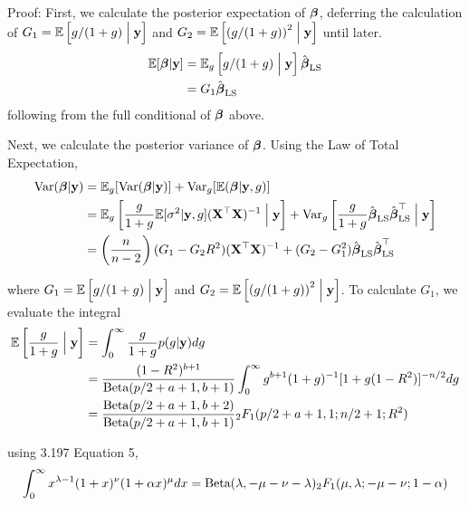 \documentclass{amsart}[12pt]
\begin{document}
Proof:
First, we calculate the posterior expectation of ${\boldsymbol \beta}$, deferring the calculation of
$G_1 = \mathbb{E}\left[g/(1+g) \Bigm| {\bf y} \right]$ and $G_2 = \mathbb{E}\left[ \left(g/(1+g) \right)^2 \Bigm| {\bf y} \right]$
until later.
\begin{align*}
	\mathbb{E}[{\boldsymbol \beta} | {\bf y}] &= \mathbb{E}_g \left[g/(1+g) \Bigm| {\bf y} \right] \hat{{\boldsymbol \beta}}_{\text{LS}} \\
	&= G_1 \hat{{\boldsymbol \beta}}_{\text{LS}}
\end{align*}
following from the full conditional of ${\boldsymbol \beta}$ above.

Next, we calculate the posterior variance of ${\boldsymbol \beta}$. Using the Law of Total Expectation,
\begin{align*}
	\text{Var}({\boldsymbol \beta} | {\bf y}) & = \mathbb{E}_g[\text{Var}({\boldsymbol \beta} | {\bf y})] + \text{Var}_g[\mathbb{E}({\boldsymbol \beta}|{\bf y}, g)]                                                                                                                                                 \\
	                   & = \mathbb{E}_g\left[\frac{g}{1 + g} \mathbb{E}[\sigma^2|{\bf y}, g] ({\bf X}^\top {\bf X})^{-1} \Bigm| {\bf y} \right] + \text{Var}_g\left[\frac{g}{1 + g} \hat{{\boldsymbol \beta}}_{\text{LS}} \hat{{\boldsymbol \beta}}_{\text{LS}}^\top \Bigm| {\bf y} \right]                                   \\
	                   & = \left( \frac{n}{n - 2} \right) (G_1 - G_2 R^2) ({\bf X}^\top {\bf X})^{-1} + (G_2 - G_1^2) \hat{{\boldsymbol \beta}}_{\text{LS}} \hat{{\boldsymbol \beta}}_{\text{LS}}^\top                                                                                      
\end{align*}

\noindent where $G_1 = \mathbb{E}\left[g/(1+g) \Bigm| {\bf y} \right]$ and $G_2 = \mathbb{E}\left[ \left(g/(1+g) \right)^2 \Bigm| {\bf y} \right]$. To calculate $G_1$, we evaluate the integral
\begin{align*}
	\mathbb{E}\left[\frac{g}{1 + g} \Bigm| {\bf y} \right] & = \int_0^\infty \frac{g}{1 + g} p(g | {\bf y}) dg                                                                      \\
	                                           & = \frac{(1 - R^2)^{b+1}}{\text{Beta}(p/2 + a + 1, b + 1)} \int_0^\infty g^{b+1} (1 + g)^{-1} [1 + g (1 - R^2)]^{-n/2} dg \\
	                                           & = \frac{\text{Beta}(p/2 + a + 1, b + 2)}{\text{Beta}(p /2 + a + 1, b + 1)} {}_2 F_1(p/2 + a + 1, 1; n/2 + 1; R^2)              
\end{align*}

\noindent using \citep{Gradshteyn1988} 3.197 Equation 5,
\[
	\int_0^\infty x^{\lambda-1} (1+x)^\nu (1 + \alpha x)^{\mu} dx = \text{Beta}(\lambda, -\mu-\nu-\lambda) {}_2 F_1 (\mu, \lambda; -\mu-\nu; 1 - \alpha)
\]
\end{document}
